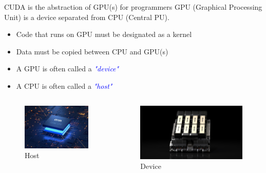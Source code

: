 \documentclass[dvipdfmx, 11pt, aspectratio=169]{beamer}   %
\begin{document}
\begin{frame}{CUDA is the abstraction of GPU(s) for programmers}
  GPU (Graphical Processing Unit) is a device separated from CPU (Central PU).
  \begin{itemize}
    \item Code that runs on GPU must be designated as a kernel
    \item Data must be copied between CPU and GPU(s)
    \item A GPU is often called a \textcolor{blue}{\textit{"device"}}
    \item A CPU is often called a \textcolor{blue}{\textit{"host"}}
  \end{itemize}
  \begin{columns}
    \begin{figure}
      \includegraphics[scale=0.2]{img/host.png}
      \caption{Host}
    \end{figure}
    \begin{figure}
      \includegraphics[scale=0.15]{img/device.jpg}
      \caption{Device}
    \end{figure}
  \end{columns}
\end{frame}
\end{document}
